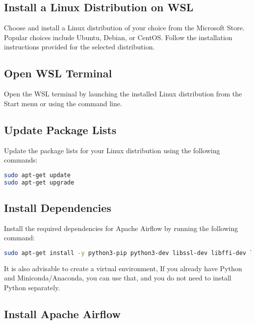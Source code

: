 \subsection{Install a Linux Distribution on WSL}

Choose and install a Linux distribution of your choice from the Microsoft Store. Popular choices include Ubuntu, Debian, or CentOS. Follow the installation instructions provided for the selected distribution.

\subsection{Open WSL Terminal}

Open the WSL terminal by launching the installed Linux distribution from the Start menu or using the command line.

\subsection{Update Package Lists} \label{subsec:wsl_update_packge}

Update the package lists for your Linux distribution using the following commands:

\begin{lstlisting}[language=bash]
sudo apt-get update
sudo apt-get upgrade
\end{lstlisting}

\subsection{Install Dependencies}

Install the required dependencies for Apache Airflow by running the following command:

\begin{lstlisting}[language=bash]
sudo apt-get install -y python3-pip python3-dev libssl-dev libffi-dev libmysqlclient-dev libjpeg8-dev zlib1g-dev
\end{lstlisting}
\begin{outline}
  It is also advisable to create a virtual environment, If you already have Python and Miniconda/Anaconda, you can use that, and you do not need to install Python separately.
\end{outline}

\subsection{Install Apache Airflow}

